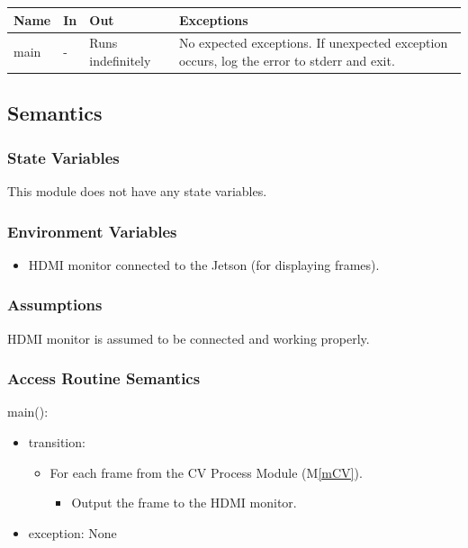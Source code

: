 \documentclass[12pt, titlepage]{article}
\newcommand{\mref}[1]{M\ref{#1}}
\begin{document}
\begin{center}
  \begin{tabular}{p{3cm} p{4cm} p{4cm} p{3.5cm}}
    \hline
    \textbf{Name} & \textbf{In} & \textbf{Out}      & \textbf{Exceptions}                                                                       \\
    \hline
    main          & -           & Runs indefinitely & No expected exceptions. If unexpected exception occurs, log the error to stderr and exit. \\
    \hline
  \end{tabular}
\end{center}

\subsection{Semantics}

\subsubsection{State Variables}

This module does not have any state variables.

\subsubsection{Environment Variables}

\begin{itemize}
  \item HDMI monitor connected to the Jetson (for displaying frames).
\end{itemize}

\subsubsection{Assumptions}

HDMI monitor is assumed to be connected and working properly.

\subsubsection{Access Routine Semantics}

\noindent main():
\begin{itemize}
  \item transition:
        \begin{itemize}
          \item For each frame from the CV Process Module (\mref{mCV}).
                \begin{itemize}
                  \item Output the frame to the HDMI monitor.
                \end{itemize}
        \end{itemize}
  \item exception: None
\end{itemize}
\end{document}
